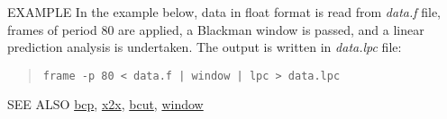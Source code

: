 \begin{options}
\end{options}


\begin{qsection}{EXAMPLE}
In the example below, data in float format is read from {\em data.f} file,
frames of period 80 are applied, a Blackman window is passed, and
a linear prediction analysis is undertaken. The output is written in
{\em data.lpc} file:
\begin{quote}
 \verb!frame -p 80 < data.f | window | lpc > data.lpc!
\end{quote} 
\end{qsection}

\begin{qsection}{SEE ALSO}
\hyperlink{bcp}{bcp},
\hyperlink{x2x}{x2x},
\hyperlink{bcut}{bcut},
\hyperlink{window}{window}
\end{qsection}
